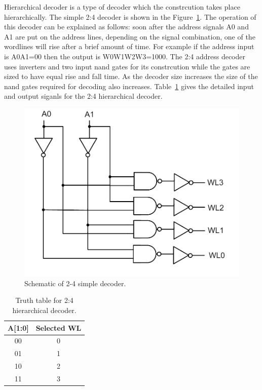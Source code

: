 Hierarchical decoder is a type of decoder which the constrcution takes place hierarchically. 
The simple 2:4 decoder is shown in the Figure~\ref{fig:2 to 4 decoder}. The operation of
this decoder can be explained as follows: soon after the address signals A0 and A1 are put on the address lines, 
depending on the signal combination, one of the wordlines will rise after a brief amount of time. For example if the
address input is A0A1=00 then the output is W0W1W2W3=1000. The 2:4 address decoder uses inverters and two 
input nand gates for its constrcution while the gates are sized to have equal rise and fall time.
As the decoder size increases the size of the nand gates required for decoding also increases.
Table~\ref{table:2-4 hierarchical_decoder} gives the detailed input and output siganls
for the 2:4 hierarchical decoder. 


\begin{figure}[h!]
\centering
\includegraphics[scale=.6]{./figs/2t4decoder.pdf}
\caption{Schematic of 2-4 simple decoder.}
\label{fig:2 to 4 decoder}
\end{figure}

 \begin{table}[h!] 
   \begin{center}
     \begin{tabular}{| c | c |}
     \hline
     A[1:0] & Selected WL\\ \hline
     00 & 0\\ \hline
     01 & 1\\ \hline
     10 & 2\\ \hline
     11 & 3\\ \hline

     \end{tabular}
   \end{center}
   \caption{Truth table for 2:4 hierarchical decoder.}
   \label{table:2-4 hierarchical_decoder}
 \end{table}


